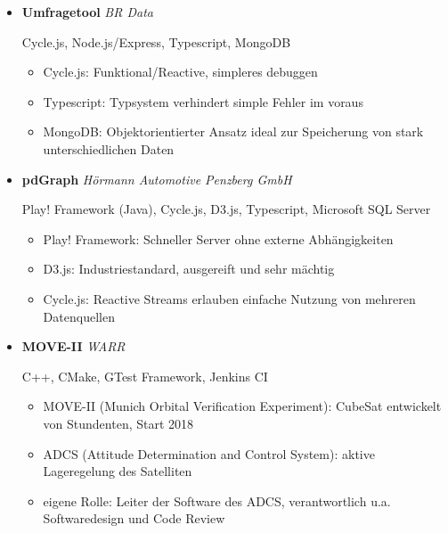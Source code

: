 \documentclass[11pt,a4paper,sans]{moderncv}        %
\begin{document}
\begin{itemize}

\item{\textbf{Umfragetool} \textit{BR Data}

\small{Cycle.js, Node.js/Express, Typescript, MongoDB}

\vspace{3pt}

\begin{small}
\begin{itemize}
\item{Cycle.js: Funktional/Reactive, simpleres debuggen}
\item{Typescript: Typsystem verhindert simple Fehler im voraus}
\item{MongoDB: Objektorientierter Ansatz ideal zur Speicherung von stark unterschiedlichen Daten}
\end{itemize}
\end{small}
}

\vspace{6pt}

\item{\textbf{pdGraph} \textit{Hörmann Automotive Penzberg GmbH}

\small{Play! Framework (Java), Cycle.js, D3.js, Typescript, Microsoft SQL Server}

\vspace{3pt}

\begin{small}
\begin{itemize}
\item{Play! Framework: Schneller Server ohne externe Abhängigkeiten}
\item{D3.js: Industriestandard, ausgereift und sehr mächtig}
\item{Cycle.js: Reactive Streams erlauben einfache Nutzung von mehreren Datenquellen}
\end{itemize}
\end{small}
}

\vspace{6pt}

\item{\textbf{MOVE-II} \textit{WARR}

\small{C++, CMake, GTest Framework, Jenkins CI}

\vspace{3pt}

\begin{small}
\begin{itemize}
\item{MOVE-II (Munich Orbital Verification Experiment): CubeSat entwickelt von Stundenten, Start 2018}
\item{ADCS (Attitude Determination and Control System): aktive Lageregelung des Satelliten}
\item{eigene Rolle: Leiter der Software des ADCS, verantwortlich u.a. Softwaredesign und Code Review}
\end{itemize}
\end{small}
}

\end{itemize}
\end{document}

